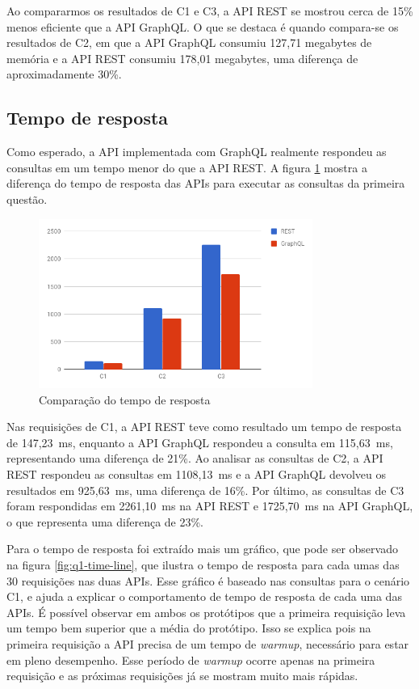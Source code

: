 Ao compararmos os resultados de C1 e C3, a API REST se mostrou cerca de 15\% menos eficiente que a API GraphQL. O que se destaca é quando compara-se os resultados de C2, em que a API GraphQL consumiu 127,71 megabytes de memória e a API REST consumiu 178,01 megabytes, uma diferença de aproximadamente 30\%.

\subsection{Tempo de resposta}

Como esperado, a API implementada com GraphQL realmente respondeu as consultas em um tempo menor do que a API REST. A figura \ref{fig:q1-time} mostra a diferença do tempo de resposta das APIs para executar as consultas da primeira questão.

\begin{figure}[htbp]
    \centering
    \includegraphics[width=0.8\textwidth]{figuras/q1-time.png}
    \caption{Comparação do tempo de resposta}
    \label{fig:q1-time}
    \author{fonte: Autor}
\end{figure}

Nas requisições de C1, a API REST teve como resultado um tempo de resposta de 147,23~ms, enquanto a API GraphQL respondeu a consulta em 115,63~ms, representando uma diferença de 21\%. Ao analisar as consultas de C2, a API REST respondeu as consultas em 1108,13~ms e a API GraphQL devolveu os resultados em 925,63~ms, uma diferença de 16\%. Por último, as consultas de C3 foram respondidas em 2261,10~ms na API REST e 1725,70~ms na API GraphQL, o que representa uma diferença de 23\%.

Para o tempo de resposta foi extraído mais um gráfico, que pode ser observado na figura \ref{fig:q1-time-line}, que ilustra o tempo de resposta para cada umas das 30 requisições nas duas APIs. Esse gráfico é baseado nas consultas para o cenário C1, e ajuda a explicar o comportamento de tempo de resposta de cada uma das APIs. É possível observar em ambos os protótipos que a primeira requisição leva um tempo bem superior que a média do protótipo. Isso se explica pois na primeira requisição a API precisa de um tempo de \textit{warmup}, necessário para estar em pleno desempenho. Esse período de \textit{warmup} ocorre apenas na primeira requisição e as próximas requisições já se mostram muito mais rápidas.


